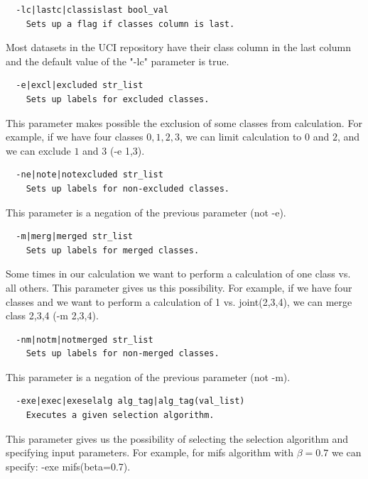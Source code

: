 \documentclass[a4paper,fleqn]{report}
\begin{document}
\begin{scriptsize}
 \begin{verbatim}
  -lc|lastc|classislast bool_val
    Sets up a flag if classes column is last.
 \end{verbatim}
\end{scriptsize}

  Most datasets in the UCI repository have their class column in the last column and the default value of the "-lc" parameter is true.

\begin{scriptsize}
 \begin{verbatim}
  -e|excl|excluded str_list
    Sets up labels for excluded classes.
 \end{verbatim}
\end{scriptsize}
  
  This parameter makes possible the exclusion of some classes from calculation. 
For example, if we have four classes ${0,1,2,3}$, we can limit calculation to $0$ and $2$, 
and we can exclude $1$ and $3$ (-e 1,3).

\begin{scriptsize}
 \begin{verbatim}
  -ne|note|notexcluded str_list
    Sets up labels for non-excluded classes.
 \end{verbatim}
\end{scriptsize}
  This parameter is a negation of the previous parameter (not -e).

\begin{scriptsize}
 \begin{verbatim}
  -m|merg|merged str_list
    Sets up labels for merged classes.
 \end{verbatim}
\end{scriptsize}

 Some times in our calculation we want to perform a calculation of one class vs. all others. This parameter gives us 
this possibility. For example, if we have four classes and we want to perform a calculation of 1 vs. joint(2,3,4), 
we can merge class 2,3,4 (-m 2,3,4).

\begin{scriptsize}
 \begin{verbatim}
  -nm|notm|notmerged str_list
    Sets up labels for non-merged classes.
 \end{verbatim}
\end{scriptsize}
  This parameter is a negation of the previous parameter (not -m).

\begin{scriptsize}
 \begin{verbatim}
  -exe|exec|exeselalg alg_tag|alg_tag(val_list)
    Executes a given selection algorithm.
 \end{verbatim}
\end{scriptsize}
  This parameter gives us the possibility of selecting the selection algorithm and specifying input parameters. For example, 
for mifs algorithm with $\beta=0.7$ we can specify: -exe mifs(beta=0.7).
\end{document}
